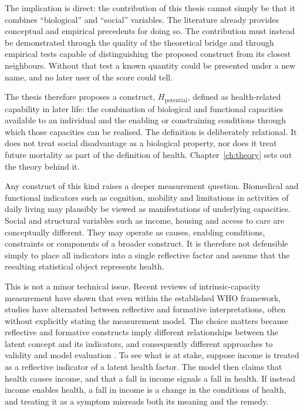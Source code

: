 The implication is direct: the contribution of this thesis cannot simply be that it combines ``biological'' and ``social'' variables. The literature already provides conceptual and empirical precedents for doing so. The contribution must instead be demonstrated through the quality of the theoretical bridge and through empirical tests capable of distinguishing the proposed construct from its closest neighbours. Without that test a known quantity could be presented under a new name, and no later user of the score could tell.

The thesis therefore proposes a construct, $H_{\text{potential}}$, defined as health-related capability in later life: the combination of biological and functional capacities available to an individual and the enabling or constraining conditions through which those capacities can be realised. The definition is deliberately relational. It does not treat social disadvantage as a biological property, nor does it treat future mortality as part of the definition of health. Chapter~\ref{ch:theory} sets out the theory behind it.

Any construct of this kind raises a deeper measurement question. Biomedical and functional indicators such as cognition, mobility and limitations in activities of daily living may plausibly be viewed as manifestations of underlying capacities. Social and structural variables such as income, housing and access to care are conceptually different. They may operate as causes, enabling conditions, constraints or components of a broader construct. It is therefore not defensible simply to place all indicators into a single reflective factor and assume that the resulting statistical object represents health.

This is not a minor technical issue. Recent reviews of intrinsic-capacity measurement have shown that even within the established WHO framework, studies have alternated between reflective and formative interpretations, often without explicitly stating the measurement model. The choice matters because reflective and formative constructs imply different relationships between the latent concept and its indicators, and consequently different approaches to validity and model evaluation \citep{bollen_lennox_1991,jarvis_2003}. To see what is at stake, suppose income is treated as a reflective indicator of a latent health factor. The model then claims that health causes income, and that a fall in income signals a fall in health. If instead income enables health, a fall in income is a change in the conditions of health, and treating it as a symptom misreads both its meaning and the remedy.

